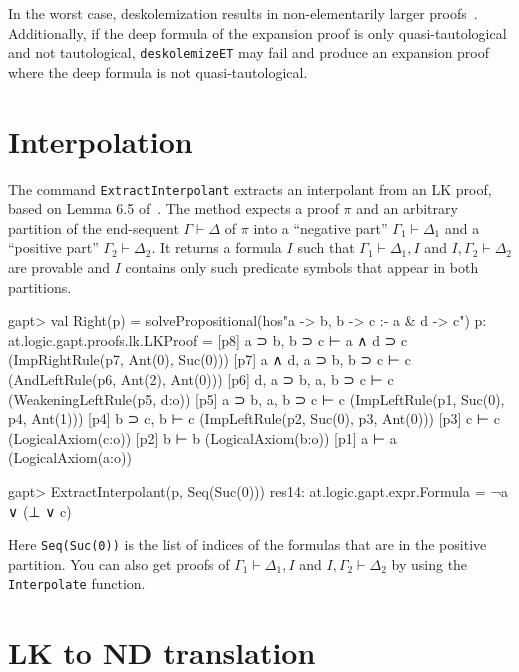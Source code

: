 \documentclass[a4paper,11pt]{book}
\newcommand{\seq}{\vdash}	%
\begin{document}
In the worst case, deskolemization results in non-elementarily larger
proofs~\cite{Aguilera2016Unsound}.  Additionally, if the deep formula of the
expansion proof is only quasi-tautological and not tautological,
\texttt{deskolemizeET} may fail and produce an expansion proof where the deep
formula is not quasi-tautological.

\section{Interpolation}

The command \texttt{ExtractInterpolant} extracts an interpolant from an LK
proof, based on Lemma 6.5 of~\cite{Takeuti87Proof}.  The method expects a proof
$\pi$ and an arbitrary partition of the end-sequent $\Gamma \seq \Delta$ of
$\pi$ into a ``negative part'' $\Gamma_1\seq\Delta_1$ and a ``positive part''
$\Gamma_2 \seq \Delta_2$.  It returns a formula $I$ such that
$\Gamma_1\seq\Delta_1, I$ and $I,\Gamma_2\seq\Delta_2$ are provable and $I$
contains only such predicate symbols that appear in both partitions.

\begin{clilisting}
gapt> val Right(p) = solvePropositional(hos"a -> b, b -> c :- a & d -> c")
p: at.logic.gapt.proofs.lk.LKProof =
[p8] a ⊃ b, b ⊃ c ⊢ a ∧ d ⊃ c    (ImpRightRule(p7, Ant(0), Suc(0)))
[p7] a ∧ d, a ⊃ b, b ⊃ c ⊢ c    (AndLeftRule(p6, Ant(2), Ant(0)))
[p6] d, a ⊃ b, a, b ⊃ c ⊢ c    (WeakeningLeftRule(p5, d:o))
[p5] a ⊃ b, a, b ⊃ c ⊢ c    (ImpLeftRule(p1, Suc(0), p4, Ant(1)))
[p4] b ⊃ c, b ⊢ c    (ImpLeftRule(p2, Suc(0), p3, Ant(0)))
[p3] c ⊢ c    (LogicalAxiom(c:o))
[p2] b ⊢ b    (LogicalAxiom(b:o))
[p1] a ⊢ a    (LogicalAxiom(a:o))

gapt> ExtractInterpolant(p, Seq(Suc(0)))
res14: at.logic.gapt.expr.Formula = ¬a ∨ (⊥ ∨ c)

\end{clilisting}

Here \texttt{Seq(Suc(0))} is the list of indices of the formulas that are in
the positive partition.  You can also get proofs of $\Gamma_1 \vdash \Delta_1,
I$ and $I, \Gamma_2 \vdash \Delta_2$ by using the \texttt{Interpolate}
function.

\section{LK to ND translation}
\end{document}
